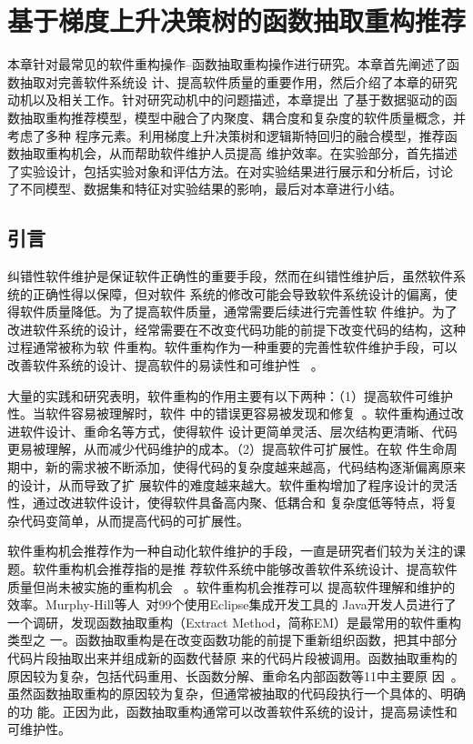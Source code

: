 

\chapter{基于梯度上升决策树的函数抽取重构推荐} 
本章针对最常见的软件重构操作--函数抽取重构操作进行研究。本章首先阐述了函数抽取对完善软件系统设
计、提高软件质量的重要作用，然后介绍了本章的研究动机以及相关工作。针对研究动机中的问题描述，本章提出
了基于数据驱动的函数抽取重构推荐模型，模型中融合了内聚度、耦合度和复杂度的软件质量概念，并考虑了多种
程序元素。利用梯度上升决策树和逻辑斯特回归的融合模型，推荐函数抽取重构机会，从而帮助软件维护人员提高
维护效率。在实验部分，首先描述了实验设计，包括实验对象和评估方法。在对实验结果进行展示和分析后，讨论
了不同模型、数据集和特征对实验结果的影响，最后对本章进行小结。

\section{引言}
纠错性软件维护是保证软件正确性的重要手段，然而在纠错性维护后，虽然软件系统的正确性得以保障，但对软件
系统的修改可能会导致软件系统设计的偏离，使得软件质量降低。为了提高软件质量，通常需要后续进行完善性软
件维护。为了改进软件系统的设计，经常需要在不改变代码功能的前提下改变代码的结构，这种过程通常被称为软
件重构。软件重构作为一种重要的完善性软件维护手段，可以改善软件系统的设计、提高软件的易读性和可维护性
~\cite{fowler,mens:TSE04}。

大量的实践和研究表明，软件重构的作用主要有以下两种：（1）提高软件可维护性。当软件容易被理解时，软件
中的错误更容易被发现和修复~\cite{martin2009clean}。软件重构通过改进软件设计、重命名等方式，使得软件
设计更简单灵活、层次结构更清晰、代码更易被理解，从而减少代码维护的成本。（2）提高软件可扩展性。在软
件生命周期中，新的需求被不断添加，使得代码的复杂度越来越高，代码结构逐渐偏离原来的设计，从而导致了扩
展软件的难度越来越大。软件重构增加了程序设计的灵活性，通过改进软件设计，使得软件具备高内聚、低耦合和
复杂度低等特点，将复杂代码变简单，从而提高代码的可扩展性。

软件重构机会推荐作为一种自动化软件维护的手段，一直是研究者们较为关注的课题。软件重构机会推荐指的是推
荐软件系统中能够改善软件系统设计、提高软件质量但尚未被实施的重构机会
~\cite{fokaefs:icse11,higo:JSME,Liu:IEEE-TSE:12,Tourwe:CSMR03,Tsantalis:2011}。软件重构机会推荐可以
提高软件理解和维护的效率。Murphy-Hill等人~\cite{Murphy-Hill:ICSE09}对99个使用Eclipse集成开发工具的
Java开发人员进行了一个调研，发现函数抽取重构（Extract Method，简称EM）是最常用的软件重构类型之
一。函数抽取重构是在改变函数功能的前提下重新组织函数，把其中部分代码片段抽取出来并组成新的函数代替原
来的代码片段被调用。函数抽取重构的原因较为复杂，包括代码重用、长函数分解、重命名内部函数等11中主要原
因~\cite{silva2016we}。虽然函数抽取重构的原因较为复杂，但通常被抽取的代码段执行一个具体的、明确的功
能。正因为此，函数抽取重构通常可以改善软件系统的设计，提高易读性和可维护性。

